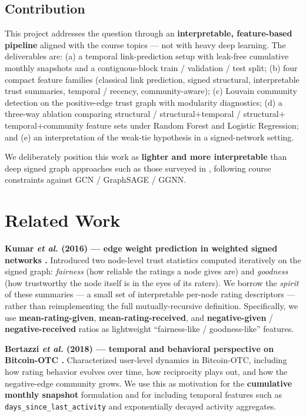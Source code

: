 \documentclass[11pt,a4paper]{article}
\newcommand{\code}[1]{\texttt{#1}}
\begin{document}
\subsection{Contribution}
This project addresses the question through an \textbf{interpretable,
feature-based pipeline} aligned with the course topics --- not with heavy
deep learning. The deliverables are: (a) a temporal link-prediction setup
with leak-free cumulative monthly snapshots and a contiguous-block
train / validation / test split; (b) four compact feature families (classical
link prediction, signed structural, interpretable trust summaries, temporal /
recency, community-aware); (c) Louvain community detection on the
positive-edge trust graph with modularity diagnostics; (d) a three-way
ablation comparing structural / structural$+$temporal /
structural$+$temporal$+$community feature sets under Random Forest and
Logistic Regression; and (e) an interpretation of the weak-tie hypothesis in
a signed-network setting.

We deliberately position this work as \textbf{lighter and more interpretable}
than deep signed graph approaches such as those surveyed in
\citet{chen2025}, following course constraints against
GCN / GraphSAGE / GGNN.

\section{Related Work}

\textbf{Kumar \textit{et al.} (2016) --- edge weight prediction in weighted
signed networks \citep{kumar2016}.} Introduced two node-level trust
statistics computed iteratively on the signed graph: \textit{fairness} (how
reliable the ratings a node gives are) and \textit{goodness} (how trustworthy
the node itself is in the eyes of its raters). We borrow the \emph{spirit} of
these summaries --- a small set of interpretable per-node rating descriptors
--- rather than reimplementing the full mutually-recursive definition.
Specifically, we use \textbf{mean-rating-given},
\textbf{mean-rating-received}, and \textbf{negative-given} /
\textbf{negative-received} ratios as lightweight
``fairness-like / goodness-like'' features.

\textbf{Bertazzi \textit{et al.} (2018) --- temporal and behavioral
perspective on Bitcoin-OTC \citep{bertazzi2018}.} Characterized user-level
dynamics in Bitcoin-OTC, including how rating behavior evolves over time,
how reciprocity plays out, and how the negative-edge community grows. We use
this as motivation for the \textbf{cumulative monthly snapshot} formulation
and for including temporal features such as \code{days\_since\_last\_activity}
and exponentially decayed activity aggregates.
\end{document}
